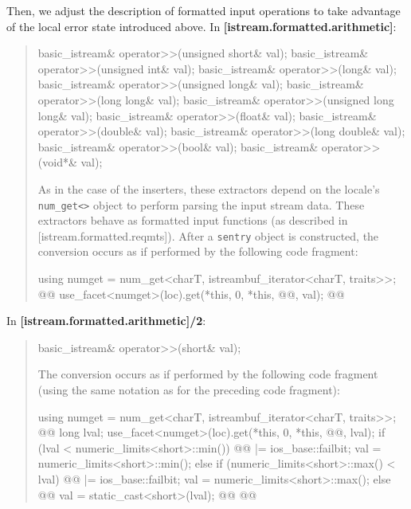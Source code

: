 \documentclass{wg21}
\begin{document}
Then, we adjust the description of formatted input operations to take advantage
of the local error state introduced above. In \textbf{[istream.formatted.arithmetic]}:
\begin{quote}
\begin{codeblock}
basic_istream& operator>>(unsigned short& val);
basic_istream& operator>>(unsigned int& val);
basic_istream& operator>>(long& val);
basic_istream& operator>>(unsigned long& val);
basic_istream& operator>>(long long& val);
basic_istream& operator>>(unsigned long long& val);
basic_istream& operator>>(float& val);
basic_istream& operator>>(double& val);
basic_istream& operator>>(long double& val);
basic_istream& operator>>(bool& val);
basic_istream& operator>>(void*& val);
\end{codeblock}
As in the case of the inserters, these extractors depend on the locale's
\texttt{num_get<>} object to perform parsing the input stream data.
These extractors behave as formatted input functions (as described in [istream.formatted.reqmts]).
After a \texttt{sentry} object is constructed, the conversion occurs as if performed by
the following code fragment:

\begin{codeblock}
  using numget = num_get<charT, istreambuf_iterator<charT, traits>>;
  @@
  use_facet<numget>(loc).get(*this, 0, *this, @@, val);
  @@
\end{codeblock}
\end{quote}

In \textbf{[istream.formatted.arithmetic]/2}:
\begin{quote}
\begin{codeblock}
basic_istream& operator>>(short& val);
\end{codeblock}
The conversion occurs as if performed by the following code fragment (using the
same notation as for the preceding code fragment):
\begin{codeblock}
  using numget = num_get<charT, istreambuf_iterator<charT, traits>>;
  @@
  long lval;
  use_facet<numget>(loc).get(*this, 0, *this, @@, lval);
  if (lval < numeric_limits<short>::min()) {
    @@ |= ios_base::failbit;
    val = numeric_limits<short>::min();
  } else if (numeric_limits<short>::max() < lval) {
    @@ |= ios_base::failbit;
    val = numeric_limits<short>::max();
  }  else @\added{\{}@
    val = static_cast<short>(lval);
  @\added{\}}@
  @@
\end{codeblock}
\end{quote}
\end{document}

